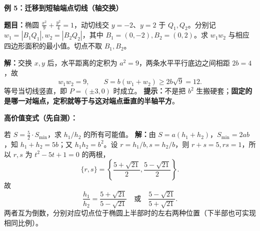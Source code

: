 \begin{examplebox}
\medskip
\textbf{\textcolor{CExample}{例 5：迁移到短轴端点切线（轴交换）}}

\textbf{题目：}椭圆 $\frac{x^2}{9}+\frac{y^2}{4}=1$，动切线交 $y=-2$、$y=2$ 于 $Q_1,Q_2$。分别记 $w_1=|B_1Q_1|,w_2=|B_2Q_2|$，其中 $B_1=(0,-2),B_2=(0,2)$。求 $w_1w_2$ 与相应四边形面积的最小值。切点不取 $B_1,B_2$。

\textbf{解：}交换 $x,y$ 后，水平距离的定积为 $a^2=9$，两条水平平行底边之间相距 $2b=4$，故
\[
\boxed{w_1w_2=9},\qquad
S=b(w_1+w_2)\ge2b\sqrt{9}=\boxed{12}.
\]
等号当切线竖直，即 $P=(\pm3,0)$ 时成立。
\textbf{提示：}不是把 $b^2$ 生搬硬套；\textbf{固定的是哪一对端点，定积就等于与这对端点垂直的半轴平方}。

\medskip
\textbf{\textcolor{CExample}{高价值变式（先自测）：} }

若 $S=\frac52\cdot S_{\min}$，求 $h_1/h_2$ 的所有可能值。
\textbf{解：}由 $S=a(h_1+h_2)$，$S_{\min}=2ab$，知 $h_1+h_2=5b$；又 $h_1h_2=b^2$。设 $r=h_1/b,s=h_2/b$，则 $r+s=5,rs=1$，所以 $r,s$ 为 $t^2-5t+1=0$ 的两根，
\[
\{r,s\}=\left\{\frac{5+\sqrt{21}}2,\frac{5-\sqrt{21}}2\right\}.
\]
故
\[
\boxed{\frac{h_1}{h_2}=\frac{5+\sqrt{21}}{5-\sqrt{21}}
\quad\text{或}\quad
\frac{5-\sqrt{21}}{5+\sqrt{21}}}.
\]
两者互为倒数，分别对应切点位于椭圆上半部时的左右两种位置（下半部也可实现相同比例）。
\end{examplebox}
